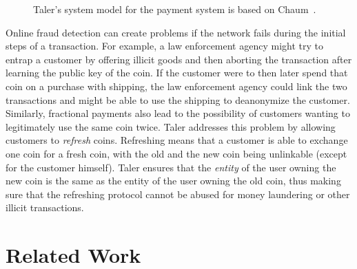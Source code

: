 \documentclass{llncs}
\begin{document}
\begin{figure}[h]
\centering
{}
\caption{Taler's system model for the payment system is based on Chaum~\cite{chaum1983blind}.}
\label{fig:cmm}
\end{figure}

Online fraud detection can create problems if the network fails during
the initial steps of a transaction.  For example, a law enforcement
agency might try to entrap a customer by offering illicit goods and
then aborting the transaction after learning the public key of the
coin.  If the customer were to then later spend that coin on a
purchase with shipping, the law enforcement agency could link the two
transactions and might be able to use the shipping to deanonymize the
customer.  Similarly, fractional payments also lead to the
possibility of customers wanting to legitimately use the same coin
twice.  Taler addresses this problem by allowing customers to {\em
  refresh} coins.  Refreshing means that a customer is able to
exchange one coin for a fresh coin, with the old and the new coin
being unlinkable (except for the customer himself).  Taler ensures
that the {\em entity} of the user owning the new coin is the same as the
entity of the user owning the old coin, thus making sure that the
refreshing protocol cannot be abused for money laundering or other
illicit transactions.


\section{Related Work}
\end{document}
